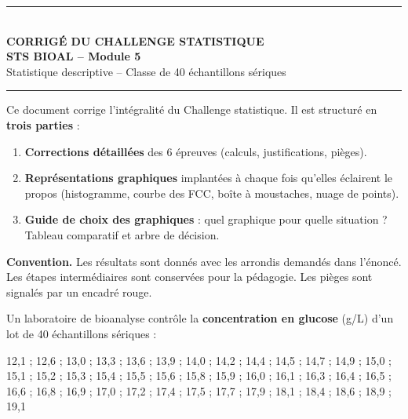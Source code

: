 \documentclass[11pt,a4paper]{article}
\newcommand{\dataS}{%
12{,}1 ; 12{,}6 ; 13{,}0 ; 13{,}3 ; 13{,}6 ; 13{,}9 ; 14{,}0 ; 14{,}2 ;
14{,}4 ; 14{,}5 ; 14{,}7 ; 14{,}9 ; 15{,}0 ; 15{,}1 ; 15{,}2 ; 15{,}3 ;
15{,}4 ; 15{,}5 ; 15{,}6 ; 15{,}8 ; 15{,}9 ; 16{,}0 ; 16{,}1 ; 16{,}3 ;
16{,}4 ; 16{,}5 ; 16{,}6 ; 16{,}8 ; 16{,}9 ; 17{,}0 ; 17{,}2 ; 17{,}4 ;
17{,}5 ; 17{,}7 ; 17{,}9 ; 18{,}1 ; 18{,}4 ; 18{,}6 ; 18{,}9 ; 19{,}1}
\begin{document}
\begin{center}
{\color{corrige}\rule{\linewidth}{1.2pt}}\\[0.3cm]
{\Huge\bfseries\color{corrige} CORRIGÉ DU CHALLENGE STATISTIQUE}\\[0.2cm]
{\Large\bfseries\color{bioaccent} STS BIOAL -- Module 5}\\[0.1cm]
{\large Statistique descriptive -- Classe de 40 échantillons sériques}\\[0.2cm]
{\color{corrige}\rule{\linewidth}{1.2pt}}
\end{center}

\vspace{0.3cm}

\begin{tcolorbox}[colback=corrigelight,colframe=corrige,title={\textbf{Mode d'emploi de ce corrigé}},fonttitle=\bfseries]
Ce document corrige l'intégralité du Challenge statistique. Il est structuré en \textbf{trois parties} :
\begin{enumerate}[leftmargin=*,itemsep=1pt]
  \item \textbf{Corrections détaillées} des 6 épreuves (calculs, justifications, pièges).
  \item \textbf{Représentations graphiques} implantées à chaque fois qu'elles éclairent le propos (histogramme, courbe des FCC, boîte à moustaches, nuage de points).
  \item \textbf{Guide de choix des graphiques} : quel graphique pour quelle situation ? Tableau comparatif et arbre de décision.
\end{enumerate}

\medskip
\textbf{Convention.} Les résultats sont donnés avec les arrondis demandés dans l'énoncé. Les étapes intermédiaires sont conservées pour la pédagogie. Les pièges sont signalés par un encadré rouge.
\end{tcolorbox}

\vspace{0.3cm}

\begin{tcolorbox}[colback=bioyellow,colframe=bioaccent,title={\textbf{Rappel du contexte commun}},fonttitle=\bfseries]
Un laboratoire de bioanalyse contrôle la \textbf{concentration en glucose} (g/L) d'un lot de 40 échantillons sériques :
\vspace{0.2cm}
\centering
\begin{minipage}{0.95\linewidth}
\small\dataS
\end{minipage}
\end{tcolorbox}
\end{document}
